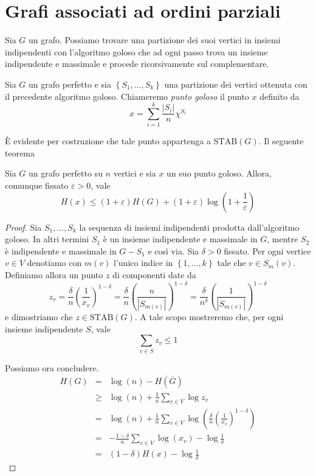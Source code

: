 \section{Grafi associati ad ordini parziali}

Sia \(G\) un grafo. Possiamo trovare una partizione dei suoi vertici in insiemi indipendenti con l'algoritmo goloso che ad ogni passo trova un insieme indipendente e massimale e procede ricorsivamente sul complementare. 
\begin{definition}
	Sia \(G\) un grafo perfetto e sia \(\left\{S_1,\dots,S_k\right\}\) una partizione dei vertici ottenuta con il precedente algoritmo goloso. Chiameremo \emph{punto goloso} il punto \(x\) definito da
	\[x=\sum_{i=1}^k\frac{|S_i|}{n}\chi^{S_i}\]
\end{definition}
È evidente per costruzione che tale punto appartenga a \(\text{STAB}(G)\). Il seguente teorema
\begin{theorem}
	Sia \(G\) un grafo perfetto su \(n\) vertici e sia \(x\) un suo punto goloso. Allora, comunque fissato \(\varepsilon>0\), vale
	\[H(x)\le(1+\varepsilon)H(G)+(1+\varepsilon)\log\left(1+\frac{1}{\varepsilon}\right)\]
\end{theorem}
\begin{proof}
	Sia \(S_1,\dots,S_k\) la sequenza di insiemi indipendenti prodotta dall'algoritmo goloso. In altri termini \(S_1\) è un insieme indipendente e massimale in \(G\), mentre \(S_2\) è indipendente e massimale in \(G-S_1\) e così via. Sia \(\delta>0\) fissato. Per ogni vertice \(v\in V\) denotiamo con \(m(v)\) l'unico indice in \(\left\{1,\dots,k\right\}\) tale che \(v\in S_m(v)\). Definiamo allora un punto \(z\) di componenti date da
	\[z_v=\frac{\delta}{n}\left(\frac{1}{x_v}\right)^{1-\delta}=\frac{\delta}{n}\left(\frac{n}{|S_{m(v)}|}\right)^{1-\delta}=\frac{\delta}{n^{\delta}}\left(\frac{1}{|S_{m(v)}|}\right)^{1-\delta}\]
	e dimostriamo che \(z\in\text{STAB}(G)\). A tale scopo mostreremo che, per ogni insieme indipendente \(S\), vale
	\[\sum_{v\in S}{z_v}\le 1\]
	
	Possiamo ora concludere.
	\begin{eqnarray}
	  H(G)&=&\log(n)-H(\overline{G}) \nonumber \\
	      &\ge& \log(n) + \frac{1}{n}\sum_{v\in V}{\log{z_v}}\nonumber \\
	      &=& \log(n) + \frac{1}{n}\sum_{v\in V}{\log\left(\frac{\delta}{n}\left(\frac{1}{x_v}\right)^{1-\delta}\right)} \nonumber \\
	      &=& - \frac{1-\delta}{n}\sum_{v\in V}{\log(x_v)}-\log{\frac{1}{\delta}} \nonumber \\
	      &=& (1-\delta)H(x)-\log{\frac{1}{\delta}} \nonumber
	\end{eqnarray}
\end{proof}
